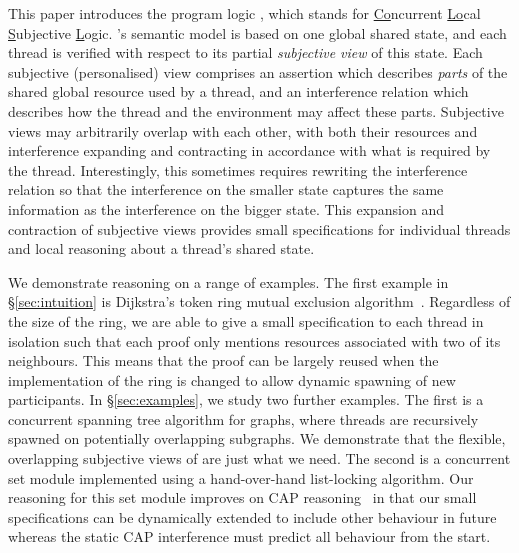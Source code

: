 This paper introduces the program logic \colosl, which stands for
\underline{Co}ncurrent \underline{Lo}cal \underline{S}ubjective
\underline{L}ogic. \colosl's semantic model is based on one global
shared state, and each thread is verified with respect to its partial
{\em subjective view} of this state. Each subjective (personalised)
view comprises an assertion which describes \emph{parts} of the shared
global resource used by a thread, and an interference relation which
describes how the thread and the environment may affect these parts.
Subjective views may arbitrarily overlap with each other, with both
their resources and interference expanding and contracting in
accordance with what is required by the thread. Interestingly, this
sometimes requires rewriting the interference relation so that the
interference on the smaller state captures the same information as the
interference on the bigger state. This expansion and contraction of
subjective views provides small specifications for individual threads
and local reasoning about a thread's shared state.



We demonstrate \colosl reasoning on a range of examples.  The first
example in \S\ref{sec:intuition} is Dijkstra's token ring mutual
exclusion algorithm~\cite{dijkstra74}. Regardless of the size of the
ring, we are able to give a small specification to  each thread in
isolation such that each proof only mentions resources
associated with two of its neighbours. This means that the proof can be largely reused when the
implementation of the ring is changed to allow dynamic spawning of new
participants.  In \S\ref{sec:examples}, we study two further
examples. The first is a concurrent spanning tree algorithm for
graphs, where threads are recursively spawned on potentially
overlapping subgraphs. We demonstrate that the flexible, overlapping
subjective views of \colosl are just what we need. 
The second is a concurrent set module implemented 
using a hand-over-hand
list-locking algorithm. Our \colosl reasoning  for this set module  improves
on CAP reasoning~\cite{cap-ecoop10} in that our small
specifications can be dynamically extended to include other behaviour
in future
whereas the  static CAP interference  must predict all behaviour from the start. 



